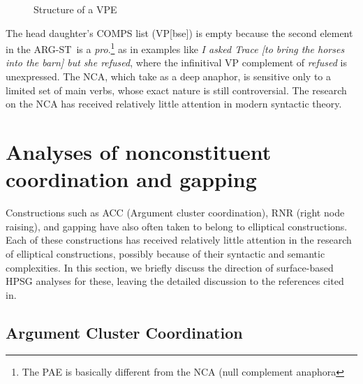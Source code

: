 \documentclass[output=paper
                ,modfonts
                ,nonflat
	        ,collection
	        ,collectionchapter
	        ,collectiontoclongg
 	        ,biblatex
                ,babelshorthands
                ,newtxmath
                ,draftmode
                ,colorlinks, citecolor=brown
]{./langsci/langscibook}
\begin{document}
{\begin{figure}[h!]
\caption{Structure of a VPE}\label{fig-53}
\end{figure}
%
The head daughter's COMPS list (VP[bse]) is empty because the second element in the ARG-ST\ is a \textit{pro}.\footnote{The PAE is basically different from the NCA (null complement anaphora} as in examples like {\it I asked Trace [to bring the horses into the
barn] but she refused}, where the infinitival VP complement of
{\it refused} is unexpressed. The NCA,  which \citet{Hankamar1976} take as a
deep anaphor, is sensitive only
to a limited set of main verbs, whose exact nature is still controversial.
The research on the NCA has received relatively little attention in modern
syntactic theory.}



\section{Analyses of nonconstituent coordination and gapping}
\label{sec-analyses-of-noncon}

Constructions such as ACC (Argument cluster coordination),
RNR (right node raising), and gapping have also often taken to belong
to elliptical constructions. Each of these constructions has received
relatively little attention in the research of elliptical constructions, possibly
because of their syntactic and semantic complexities. In this
section, we briefly discuss the direction of surface-based HPSG analyses
for these, leaving the detailed discussion
to the references cited in.
%
%
%
%

\subsection{Argument Cluster Coordination}
\end{document}
